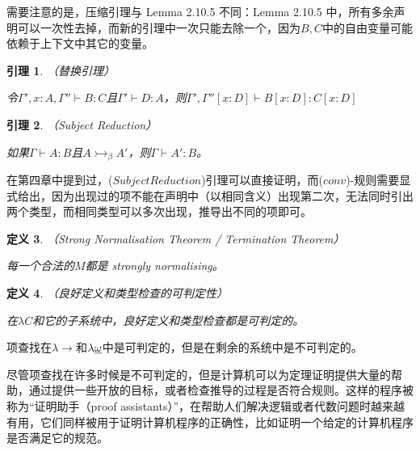 \documentclass[UTF8]{article}
\newtheorem{thm}{定义}[section]
\newtheorem{lemma}[thm]{引理}
\begin{document}
		需要注意的是，压缩引理与 Lemma 2.10.5 不同：Lemma 2.10.5 中，所有多余声明可以一次性去掉，而新的引理中一次只能去除一个，因为$B,C$中的自由变量可能依赖于上下文中其它的变量。
		
		\begin{lemma}（替换引理）
			
			令$\Gamma',x:A,\Gamma''\vdash B:C$且$\Gamma'\vdash D:A$，则$\Gamma',\Gamma''\left[ x:D\right]\vdash B
			\left[x:D\right]:C\left[ x:D\right]$
		\end{lemma}
	
		\begin{lemma}（Subject Reduction）
			
			如果$\Gamma\vdash A:B$且$A\rightarrowtail_\beta A'$，则$\Gamma\vdash A':B$。
		\end{lemma}
	
		在第四章中提到过，($Subject Reduction$)引理可以直接证明，而($conv$)-规则需要显式给出，因为出现过的项不能在声明中（以相同含义）出现第二次，无法同时引出两个类型，而相同类型可以多次出现，推导出不同的项即可。
		
		\begin{thm}（Strong Normalisation Theorem / Termination Theorem）
			
			每一个合法的$M$都是 strongly normalising。
		\end{thm}
	
		\begin{thm}（良好定义和类型检查的可判定性）
			
			在$\lambda{C}$和它的子系统中，良好定义和类型检查都是可判定的。
		\end{thm}
	
		项查找在$\lambda{\rightarrow}$和$\lambda{\uline{\omega}}$中是可判定的，但是在剩余的系统中是不可判定的。
		
		尽管项查找在许多时候是不可判定的，但是计算机可以为定理证明提供大量的帮助，通过提供一些开放的目标，或者检查推导的过程是否符合规则。这样的程序被称为“证明助手（proof assistants）”，在帮助人们解决逻辑或者代数问题时越来越有用，它们同样被用于证明计算机程序的正确性，比如证明一个给定的计算机程序是否满足它的规范。
\end{document}
